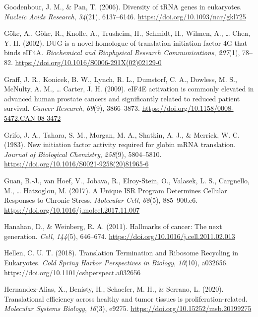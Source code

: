\documentclass[12pt,openany]{book}
\begin{document}
\hypertarget{ref-Goodenbour2006}{}
Goodenbour, J. M., \& Pan, T. (2006). Diversity of tRNA genes in
eukaryotes. \emph{Nucleic Acids Research}, \emph{34}(21), 6137--6146.
\url{https://doi.org/10.1093/nar/gkl725}

\hypertarget{ref-Goke2002}{}
Göke, A., Göke, R., Knolle, A., Trusheim, H., Schmidt, H., Wilmen, A.,
\ldots{} Chen, Y. H. (2002). DUG is a novel homologue of translation
initiation factor 4G that binds eIF4A. \emph{Biochemical and Biophysical
Research Communications}, \emph{297}(1), 78--82.
\url{https://doi.org/10.1016/S0006-291X(02)02129-0}

\hypertarget{ref-Graff2009}{}
Graff, J. R., Konicek, B. W., Lynch, R. L., Dumstorf, C. A., Dowless, M.
S., McNulty, A. M., \ldots{} Carter, J. H. (2009). eIF4E activation is
commonly elevated in advanced human prostate cancers and significantly
related to reduced patient survival. \emph{Cancer Research},
\emph{69}(9), 3866--3873.
\url{https://doi.org/10.1158/0008-5472.CAN-08-3472}

\hypertarget{ref-Grifo1983}{}
Grifo, J. A., Tahara, S. M., Morgan, M. A., Shatkin, A. J., \& Merrick,
W. C. (1983). New initiation factor activity required for globin mRNA
translation. \emph{Journal of Biological Chemistry}, \emph{258}(9),
5804--5810. \url{https://doi.org/10.1016/S0021-9258(20)81965-6}

\hypertarget{ref-Guan2017}{}
Guan, B.-J., van Hoef, V., Jobava, R., Elroy-Stein, O., Valasek, L. S.,
Cargnello, M., \ldots{} Hatzoglou, M. (2017). A Unique ISR Program
Determines Cellular Responses to Chronic Stress. \emph{Molecular Cell},
\emph{68}(5), 885--900.e6.
\url{https://doi.org/10.1016/j.molcel.2017.11.007}

\hypertarget{ref-Hanahan2011}{}
Hanahan, D., \& Weinberg, R. A. (2011). Hallmarks of cancer: The next
generation. \emph{Cell}, \emph{144}(5), 646--674.
\url{https://doi.org/10.1016/j.cell.2011.02.013}

\hypertarget{ref-Hellen2018}{}
Hellen, C. U. T. (2018). Translation Termination and Ribosome Recycling
in Eukaryotes. \emph{Cold Spring Harbor Perspectives in Biology},
\emph{10}(10), a032656.
\url{https://doi.org/10.1101/cshperspect.a032656}

\hypertarget{ref-Hernandez-Alias2020}{}
Hernandez-Alias, X., Benisty, H., Schaefer, M. H., \& Serrano, L.
(2020). Translational efficiency across healthy and tumor tissues is
proliferation-related. \emph{Molecular Systems Biology}, \emph{16}(3),
e9275. \url{https://doi.org/10.15252/msb.20199275}
\end{document}
